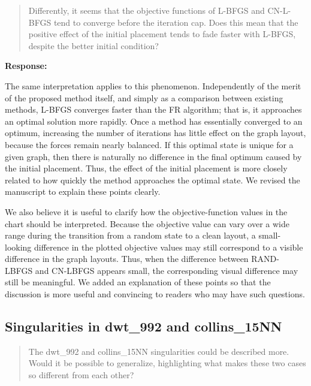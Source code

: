 \documentclass[11pt]{article}
\newcommand{\reviewercomment}[1]{%
  \begin{quote}
  \color{blue}
  #1
  \end{quote}
}
\newenvironment{response}{%
  \noindent\textbf{Response:}%
}{%
  \medskip
}
\begin{document}
\reviewercomment{
  Differently, it seems that the objective functions of L-BFGS and CN-L-BFGS tend to converge before the iteration cap.
  Does this mean that the positive effect of the initial placement tends to fade faster with L-BFGS, despite the better initial condition?
}

\begin{response}
  The same interpretation applies to this phenomenon. Independently of the merit of the proposed method itself, and simply as a comparison between existing methods, L-BFGS converges faster than the FR algorithm; that is, it approaches an optimal solution more rapidly. Once a method has essentially converged to an optimum, increasing the number of iterations has little effect on the graph layout, because the forces remain nearly balanced. If this optimal state is unique for a given graph, then there is naturally no difference in the final optimum caused by the initial placement. Thus, the effect of the initial placement is more closely related to how quickly the method approaches the optimal state. We revised the manuscript to explain these points clearly.

  We also believe it is useful to clarify how the objective-function values in the chart should be interpreted. Because the objective value can vary over a wide range during the transition from a random state to a clean layout, a small-looking difference in the plotted objective values may still correspond to a visible difference in the graph layouts.
  Thus, when the difference between RAND-LBFGS and CN-LBFGS appears small, the corresponding visual difference may still be meaningful. We added an explanation of these points so that the discussion is more useful and convincing to readers who may have such questions.
\end{response}

\subsection{Singularities in dwt\_992 and collins\_15NN}

\reviewercomment{
  The dwt\_992 and collins\_15NN singularities could be described more.
  Would it be possible to generalize, highlighting what makes these two cases so different from each other?
}
\end{document}
